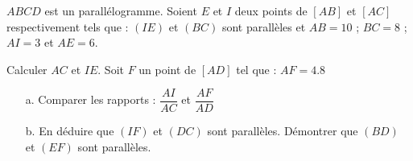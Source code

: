 \documentclass[a4paper,addpoints,12pt]{exam}
\begin{document}
\begin{exo}
$ABCD$ est un parallélogramme. Soient $E$ et $I$ deux points de $[AB]$ et $[AC]$ respectivement tels que : $(IE)$ et $(BC)$ sont parallèles et $AB=10$ ; $BC=8$ ; $AI=3$ et $AE=6$.
\begin{questions}
\question Calculer $AC$ et $IE$.
\question Soit $F$ un point de $[AD]$ tel que : $AF=4.8$
\begin{itemize}
\item[a.]Comparer les rapports : $\dfrac{AI}{AC}$ et $\dfrac{AF}{AD}$
\item[b.]En déduire que $(IF)$ et $(DC)$ sont parallèles.
\question Démontrer que $(BD)$ et $(EF)$ sont parallèles.
\end{itemize}
\end{questions} 
\end{exo}
\end{document}
